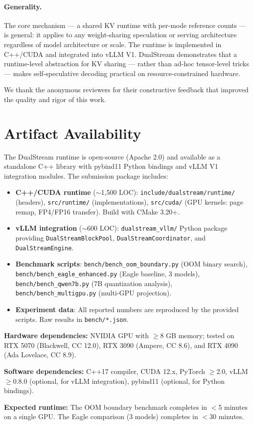 \documentclass[review]{elsarticle}
\theoremstyle{definition}
\theoremstyle{remark}
\begin{document}
\paragraph{Generality.}
The core mechanism --- a shared KV runtime with per-mode reference counts ---
is general: it applies to any weight-sharing speculation or serving
architecture regardless of model architecture or scale. The runtime is
implemented in C++/CUDA and integrated into vLLM V1. DualStream
demonstrates that a runtime-level abstraction for KV sharing — rather
than ad-hoc tensor-level tricks — makes self-speculative decoding practical
on resource-constrained hardware.

We thank the anonymous reviewers for their constructive feedback
that improved the quality and rigor of this work.

\section*{Artifact Availability}

The DualStream runtime is open-source (Apache 2.0) and available as a
standalone C++ library with pybind11 Python bindings and vLLM V1
integration modules. The submission package includes:

\begin{itemize}
    \item \textbf{C++/CUDA runtime} ($\sim$1,500 LOC): \texttt{include/dualstream/runtime/}
    (headers), \texttt{src/runtime/} (implementations), \texttt{src/cuda/}
    (GPU kernels: page remap, FP4/FP16 transfer). Build with CMake 3.20+.
    \item \textbf{vLLM integration} ($\sim$600 LOC): \texttt{dualstream\_vllm/}
    Python package providing \texttt{DualStreamBlockPool},
    \texttt{DualStreamCoordinator}, and \texttt{DualStreamEngine}.
    \item \textbf{Benchmark scripts}: \texttt{bench/bench\_oom\_boundary.py}
    (OOM binary search), \texttt{bench/bench\_eagle\_enhanced.py}
    (Eagle baseline, 3 models), \texttt{bench/bench\_qwen7b.py}
    (7B quantization analysis), \texttt{bench/bench\_multigpu.py}
    (multi-GPU projection).
    \item \textbf{Experiment data}: All reported numbers are reproduced by
    the provided scripts. Raw results in \texttt{bench/*.json}.
\end{itemize}

\noindent
\textbf{Hardware dependencies:} NVIDIA GPU with $\ge$8 GB memory;
tested on RTX 5070 (Blackwell, CC 12.0), RTX 3090 (Ampere, CC 8.6),
and RTX 4090 (Ada Lovelace, CC 8.9).

\noindent
\textbf{Software dependencies:} C++17 compiler, CUDA 12.x, PyTorch $\ge$2.0,
vLLM $\ge$0.8.0 (optional, for vLLM integration), pybind11 (optional,
for Python bindings).

\noindent
\textbf{Expected runtime:} The OOM boundary benchmark completes in
$<$5 minutes on a single GPU. The Eagle comparison (3 models) completes
in $<$30 minutes.



\end{document}
